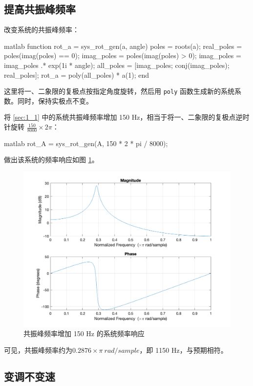 \documentclass[a4paper]{article}  %
\begin{document}
\subsection{提高共振峰频率}

改变系统的共振峰频率：
\begin{codeblock}{matlab}
function rot_a = sys_rot_gen(a, angle)
    poles = roots(a);
    real_poles = poles(imag(poles) == 0);
    imag_poles = poles(imag(poles) > 0);
    imag_poles = imag_poles .* exp(1i * angle);
    all_poles = [imag_poles; conj(imag_poles); real_poles];
    rot_a = poly(all_poles) * a(1);
end
\end{codeblock}

这里将一、二象限的复极点按指定角度旋转，然后用 \texttt{poly} 函数生成新的系统系数。同时，保持实极点不变。

将 \ref{sec:1_1} 中的系统共振峰频率增加 150 Hz，相当于将一、二象限的复极点逆时针旋转 $\frac{150}{8000} \times 2\pi$：
\begin{codeblock}{matlab}
rot_A = sys_rot_gen(A, 150 * 2 * pi / 8000);
\end{codeblock}

做出该系统的频率响应如图 \ref{fig:1_12_freqz}。

\begin{figure}[ht]
    \centering
    \includegraphics[width=.6\textwidth]{asserts/1_12_freqz.png}
    \caption{
        共振峰频率增加 150 Hz 的系统频率响应
    }\label{fig:1_12_freqz}
\end{figure}

可见，共振峰频率约为$0.2876\times \pi\ rad/sample$，即 1150 Hz，与预期相符。

\subsection{变调不变速}
\end{document}
